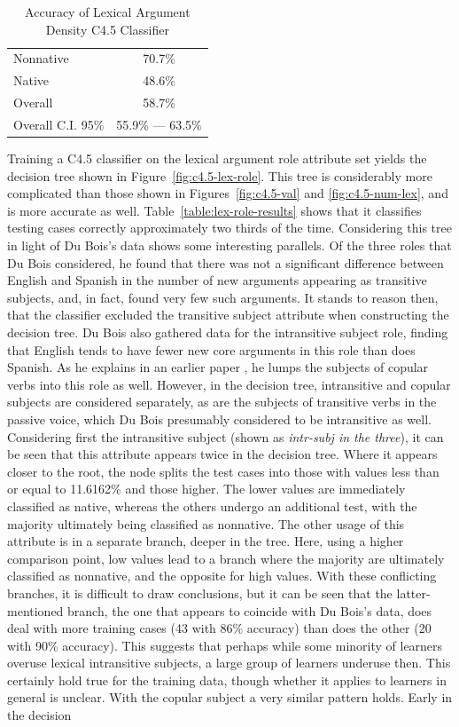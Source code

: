 \documentclass[main.tex]{subfiles}
\begin{document}
\begin{table}[ht]
\centering
\caption{Accuracy of Lexical Argument Density C4.5 Classifier}
\begin{tabular}{l c}
\toprule
Nonnative & 70.7\% \\
Native & 48.6\% \\
Overall & 58.7\% \\
Overall C.I. 95\% & 55.9\% --- 63.5\%\\
\bottomrule
\end{tabular}
\label{table:num-lex-results}
\end{table}

Training a C4.5 classifier on the lexical argument role attribute set yields the decision tree shown in Figure~\ref{fig:c4.5-lex-role}. This tree is considerably more complicated than those shown in Figures~\ref{fig:c4.5-val} and \ref{fig:c4.5-num-lex}, and is more accurate as well. Table~\ref{table:lex-role-results} shows that it classifies testing cases correctly approximately two thirds of the time. Considering this tree in light of Du Bois's data shows some interesting parallels. Of the three roles that Du Bois considered, he found that there was not a significant difference between English and Spanish in the number of new arguments appearing as transitive subjects, and, in fact, found very few such arguments. It stands to reason then, that the classifier excluded the transitive subject attribute when constructing the decision tree. Du Bois also gathered data for the intransitive subject role, finding that English tends to have fewer new core arguments in this role than does Spanish. As he explains in an earlier paper \citep{dubois:1987}, he lumps the subjects of copular verbs into this role as well. However, in the decision tree, intransitive and copular subjects are considered separately, as are the subjects of transitive verbs in the passive voice, which Du Bois presumably considered to be intransitive as well. Considering first the intransitive subject (shown as \textit{intr-subj in the three}), it can be seen that this attribute appears twice in the decision tree. Where it appears closer to the root, the node splits the test cases into those with values less than or equal to 11.6162\% and those higher. The lower values are immediately classified as native, whereas the others undergo an additional test, with the majority ultimately being classified as nonnative. The other usage of this attribute is in a separate branch, deeper in the tree. Here, using a higher comparison point, low values lead to a branch where the majority are ultimately classified as nonnative, and the opposite for high values. With these conflicting branches, it is difficult to draw conclusions, but it can be seen that the latter-mentioned branch, the one that appears to coincide with Du Bois's data, does deal with more training cases (43 with 86\% accuracy) than does the other (20 with 90\% accuracy). This suggests that perhaps while some minority of learners overuse lexical intransitive subjects, a large group of learners underuse then. This certainly hold true for the training data, though whether it applies to learners in general is unclear. With the copular subject a very similar pattern holds. Early in the decision 
\end{document}
